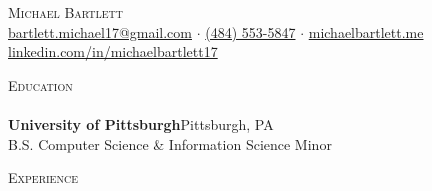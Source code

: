 \documentclass[letterpaper]{article}
\newcommand{\lineunder} {
    \vspace*{-8pt} \\
    \hspace*{-18pt} \hrulefill \\
}
\newcommand{\header} [1] {
    {\hspace*{-18pt}\vspace*{6pt} \textsc{#1}}
    \vspace*{-6pt} \lineunder
}
\begin{document}
\vspace*{-40pt}



\vspace*{-10pt}
\begin{center}
    {\fontsize{17.28pt}{20pt}\selectfont \scshape {Michael Bartlett}}\\
    \href{mailto:bartlett.michael17@gmail.com}{bartlett.michael17@gmail.com} $\cdot$ \href{tel:4845535847}{(484) 553-5847} $\cdot$ \href{http://michaelbartlett.me}{michaelbartlett.me} \href{https://www.linkedin.com/in/michaelbartlett17/}{linkedin.com/in/michaelbartlett17} \\
\end{center}

\header{Education}
\textbf{University of Pittsburgh}\hfill Pittsburgh, PA\\
B.S. Computer Science \& Information Science Minor\\
\vspace{2mm}

\header{Experience}
\vspace{1mm}
\end{document}
